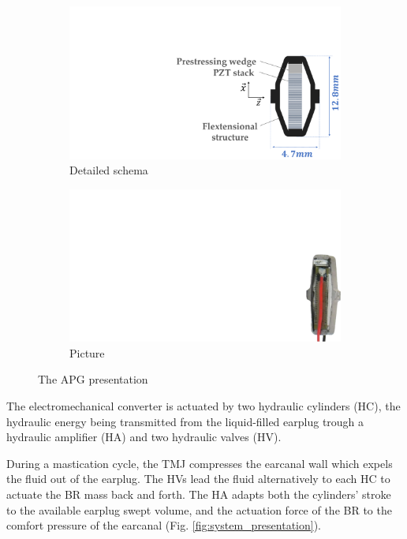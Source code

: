 \documentclass[3p,twocolumn,preprint]{elsarticle}
\def \hfillx {\hspace*{ -\linewidth} \hfill} %
\begin{document}
\begin{figure}[!htb]
	\begin{center}
		\begin{subfigure}[t]{0.5\linewidth}
			\captionsetup{justification=centering}
			\includegraphics[trim={13cm 0cm 0cm 6cm},clip,width=\linewidth]{figures/APG_schema.pdf}
			\caption{Detailed schema}
			\label{fig:APG_schema}
		\end{subfigure}
		\hfillx
		\begin{subfigure}[t]{0.21\linewidth}
			\captionsetup{justification=centering}
			\includegraphics[trim={29.5cm 0cm 0cm 8cm},clip,width=0.65\linewidth]{figures/APG_photo.pdf}
			\caption{Picture}
			\label{fig:APG_photo}
		\end{subfigure}
		\caption{The APG presentation}
		\label{fig:APG}
	\end{center}
\end{figure}

The electromechanical converter is actuated by two hydraulic cylinders (HC), the hydraulic energy being transmitted from the liquid-filled earplug trough a hydraulic amplifier (HA) and two hydraulic valves (HV).

During a mastication cycle, the TMJ compresses the earcanal wall which expels the fluid out of the earplug. The HVs lead the fluid alternatively to each HC to actuate the BR mass back and forth. The HA adapts both the cylinders' stroke to the available earplug swept volume, and the actuation force of the BR to the comfort pressure of the earcanal (Fig. \ref{fig:system_presentation}).
\end{document}
